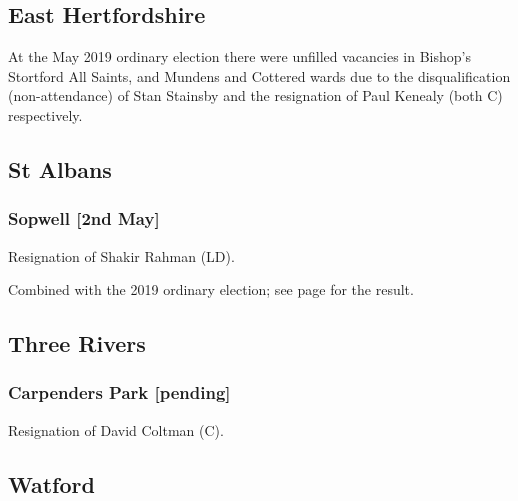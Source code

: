 \documentclass[a4paper,openany]{book}
\begin{document}
\begin{resultsiii}
\subsection*{East Hertfordshire}

At the May 2019 ordinary election there were unfilled vacancies in Bishop's Stortford All Saints, and Mundens and Cottered wards due to the disqualification (non-attendance) of Stan Stainsby and the resignation of Paul Kenealy (both C) respectively.

\subsection*{St Albans}

\subsubsection*{Sopwell \hspace*{\fill}\nolinebreak[1]%
	\enspace\hspace*{\fill}
	[2nd May]}


Resignation of Shakir Rahman (LD).

Combined with the 2019 ordinary election; see page \pageref{SopwellSaintAlbans} for the result.

\subsection*{Three Rivers}

\subsubsection*{Carpenders Park \hspace*{\fill}\nolinebreak[1]%
	\enspace\hspace*{\fill}
	[pending]}


Resignation of David Coltman (C).

\subsection*{Watford}


\end{resultsiii}
\end{document}
